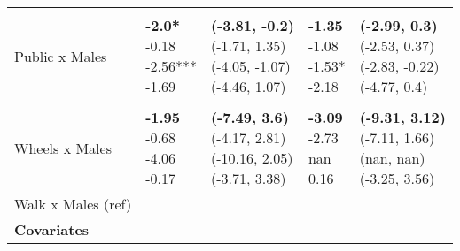 \begin{table}
\begin{center}
\begin{small}
\begin{tabular}{lllll}
& & & & \\ 
\quad Public x Males    &  \makecell[l]{\textbf{-2.0*} \\-0.18 \\-2.56*** \\-1.69 \\}   &  \makecell[l]{\textbf{(-3.81, -0.2)} \\(-1.71, 1.35) \\(-4.05, -1.07) \\(-4.46, 1.07) \\}   &  \makecell[l]{\textbf{-1.35} \\-1.08 \\-1.53* \\-2.18 \\}   &  \makecell[l]{\textbf{(-2.99, 0.3)} \\(-2.53, 0.37) \\(-2.83, -0.22) \\(-4.77, 0.4) \\} \\ 
& & & & \\ 
\quad Wheels x Males    &  \makecell[l]{\textbf{-1.95} \\-0.68 \\-4.06 \\-0.17 \\}   &  \makecell[l]{\textbf{(-7.49, 3.6)} \\(-4.17, 2.81) \\(-10.16, 2.05) \\(-3.71, 3.38) \\}   &  \makecell[l]{\textbf{-3.09} \\-2.73 \\nan \\0.16 \\}   &  \makecell[l]{\textbf{(-9.31, 3.12)} \\(-7.11, 1.66) \\(nan, nan) \\(-3.25, 3.56) \\} \\ 
\quad Walk x Males (ref) & & & & \\ 
\textbf{Covariates} & & & & \\ 

\end{tabular}
\end{small}
\end{center}
\end{table}
